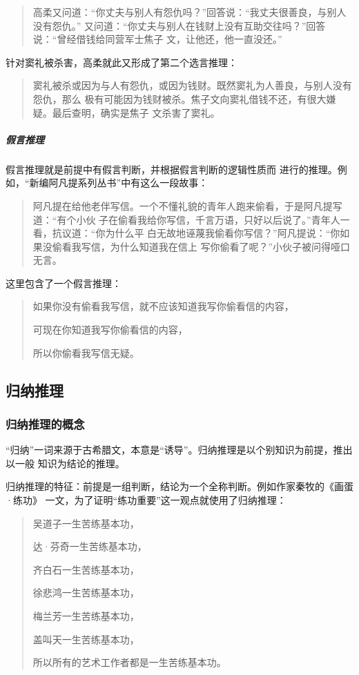 \documentclass[final,oneside]{ctexbook}
\newenvironment{equotation}{\begin{quotation}\kaishu}{\end{quotation}}
\begin{document}
\begin{equotation}
  高柔又问道：“你丈夫与别人有怨仇吗？”回答说：“我丈夫很善良，与别人没有怨仇。”
  又问道：“你丈夫与别人在钱财上没有互助交往吗？”回答说：“曾经借钱给同营军士焦子
  文，让他还，他一直没还。”
\end{equotation}
针对窦礼被杀害，高柔就此又形成了第二个选言推理：
\begin{equotation}
  窦礼被杀或因为与人有怨仇，或因为钱财。既然窦礼为人善良，与别人没有怨仇，那么
  极有可能因为钱财被杀。焦子文向窦礼借钱不还，有很大嫌疑。最后查明，确实是焦子
  文杀害了窦礼。
\end{equotation}

\subparagraph{假言推理}假言推理就是前提中有假言判断，并根据假言判断的逻辑性质而
进行的推理。例如，“新编阿凡提系列丛书”中有这么一段故事：
\begin{equotation}
  阿凡提在给他老伴写信。一个不懂礼貌的青年人跑来偷看，于是阿凡提写道：“有个小伙
  子在偷看我给你写信，千言万语，只好以后说了。”青年人一看，抗议道：“你为什么平
  白无故地诬蔑我偷看你写信？”阿凡提说：“你如果没偷看我写信，为什么知道我在信上
  写你偷看了呢？”小伙子被问得哑口无言。
\end{equotation}

这里包含了一个假言推理：
\begin{equotation}
  如果你没有偷看我写信，就不应该知道我写你偷看信的内容，

  可现在你知道我写你偷看信的内容，

  所以你偷看我写信无疑。
\end{equotation}

\subsection{归纳推理}

\subsubsection{归纳推理的概念}

“归纳”一词来源于古希腊文，本意是“诱导”。归纳推理是以个别知识为前提，推出以一般
知识为结论的推理。

归纳推理的特征：前提是一组判断，结论为一个全称判断。例如作家秦牧的《画蛋·练功》
一文，为了证明“练功重要”这一观点就使用了归纳推理：
\begin{equotation}
  吴道子一生苦练基本功，

  达·芬奇一生苦练基本功，

  齐白石一生苦练基本功，

  徐悲鸿一生苦练基本功，

  梅兰芳一生苦练基本功，

  盖叫天一生苦练基本功，

  所以所有的艺术工作者都是一生苦练基本功。
\end{equotation}
\end{document}
